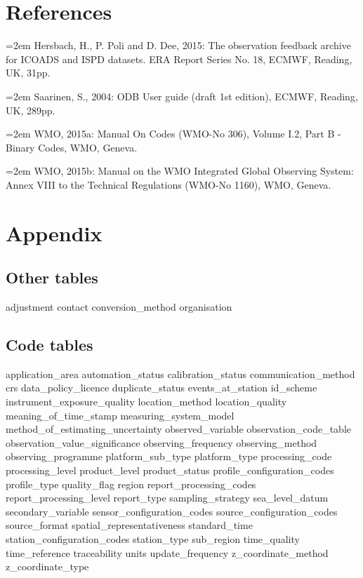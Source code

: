 \documentclass[a4paper,11pt]{article}
\begin{document}
\section {References}

\hangindent=2em Hersbach, H., P. Poli and D. Dee, 2015: The observation feedback archive for ICOADS and ISPD datasets. ERA Report Series No. 18, ECMWF, Reading, UK, 31pp.

\hangindent=2em Saarinen, S., 2004: ODB User guide (draft 1st edition), ECMWF, Reading, UK, 289pp.

\hangindent=2em WMO, 2015a: Manual On Codes (WMO-No 306), Volume I.2, Part B - Binary Codes, WMO, Geneva.

\hangindent=2em WMO, 2015b:  Manual on the WMO Integrated Global Observing System: Annex VIII to the Technical Regulations (WMO-No 1160), WMO, Geneva.

\section {Appendix}

\subsection {Other tables}
 {adjustment}
 {contact}
 {conversion_method}
 {organisation}

\subsection {Code tables}
 {application_area}
 {automation_status}
 {calibration_status}
 {communication_method}
 {crs}
 {data_policy_licence}
 {duplicate_status}
 {events_at_station}
 {id_scheme}
 {instrument_exposure_quality}
 {location_method}
 {location_quality}
 {meaning_of_time_stamp}
 {measuring_system_model}
 {method_of_estimating_uncertainty}
 {observed_variable}
 {observation_code_table}
 {observation_value_significance}
 {observing_frequency}
 {observing_method}
 {observing_programme}
 {platform_sub_type}
 {platform_type}
 {processing_code}
 {processing_level}
 {product_level}
 {product_status}
 {profile_configuration_codes}
 {profile_type}
 {quality_flag}
 {region}
 {report_processing_codes}
 {report_processing_level}
 {report_type}
 {sampling_strategy}
 {sea_level_datum}
 {secondary_variable}
 {sensor_configuration_codes}
 {source_configuration_codes}
 {source_format}
 {spatial_representativeness}
 {standard_time}
 {station_configuration_codes}
 {station_type}
 {sub_region}
 {time_quality}
 {time_reference}
 {traceability}
 {units}
 {update_frequency}
 {z_coordinate_method}
 {z_coordinate_type}

\end{document}
